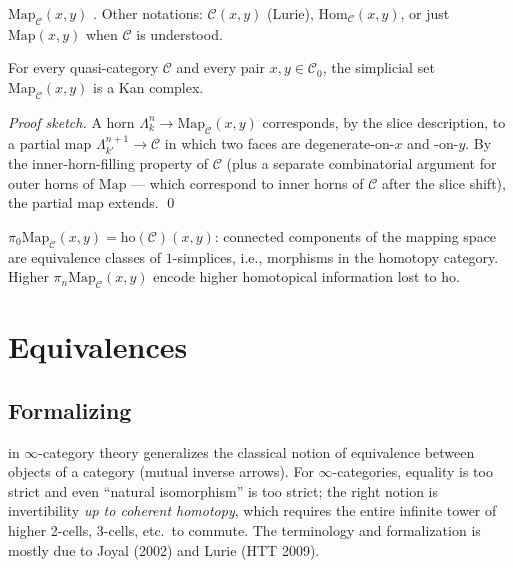 \begin{howtosay}
$\mathrm{Map}_\mathcal{C}(x, y)$ . Other notations: $\mathcal{C}(x, y)$ (Lurie),
$\mathrm{Hom}_\mathcal{C}(x, y)$, or just $\mathrm{Map}(x, y)$ when
$\mathcal{C}$ is understood.
\end{howtosay}

\begin{theorem}
\label{thm:map-is-kan}
For every quasi-category $\mathcal{C}$ and every pair $x, y \in
\mathcal{C}_0$, the simplicial set $\mathrm{Map}_\mathcal{C}(x, y)$ is a
Kan complex.
\end{theorem}

\begin{proof}[Proof sketch]
A horn $\Lambda^n_k \to \mathrm{Map}_\mathcal{C}(x, y)$ corresponds, by
the slice description, to a partial map $\Lambda^{n+1}_{k'} \to \mathcal{C}$
in which two faces are degenerate-on-$x$ and -on-$y$. By the
inner-horn-filling property of $\mathcal{C}$ (plus a separate combinatorial
argument for outer horns of $\mathrm{Map}$ — which correspond to inner
horns of $\mathcal{C}$ after the slice shift), the partial map extends.
\qed
\end{proof}

\begin{remark}
\label{rem:pi0-map}
$\pi_0 \mathrm{Map}_\mathcal{C}(x, y) = \mathrm{ho}(\mathcal{C})(x, y)$:
connected components of the mapping space are equivalence classes of
$1$-simplices, i.e., morphisms in the homotopy category. Higher
$\pi_n \mathrm{Map}_\mathcal{C}(x, y)$ encode higher homotopical
information lost to $\mathrm{ho}$.
\end{remark}


\section{Equivalences}
\label{sec:equivalences}

\subsection{Formalizing}

\begin{nameorigin}
 in $\infty$-category theory generalizes the classical
notion of equivalence between objects of a category (mutual inverse
arrows). For $\infty$-categories, equality is too strict and even
``natural isomorphism'' is too strict; the right notion is invertibility
\emph{up to coherent homotopy}, which requires the entire infinite tower
of higher 2-cells, 3-cells, etc.\ to commute. The terminology and
formalization is mostly due to Joyal (2002) and Lurie (HTT 2009).
\end{nameorigin}

